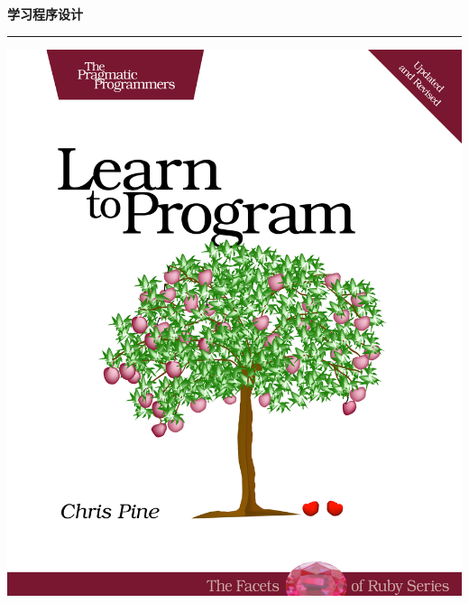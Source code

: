 \documentclass[a4paper, 12pt, openany]{book}
\begin{document}
\setlength{\parindent}{2em}                    


\begin{titlepage}
\vspace*{4ex}
  \begin{flushright}
    \Huge\textbf{学习程序设计}
  \end{flushright}
  \rule{\textwidth}{.2ex}
  \hspace{2em}\includegraphics[scale=0.9]{cover}
\end{titlepage}
\newpage



\tableofcontents
\newpage





\end{document}

